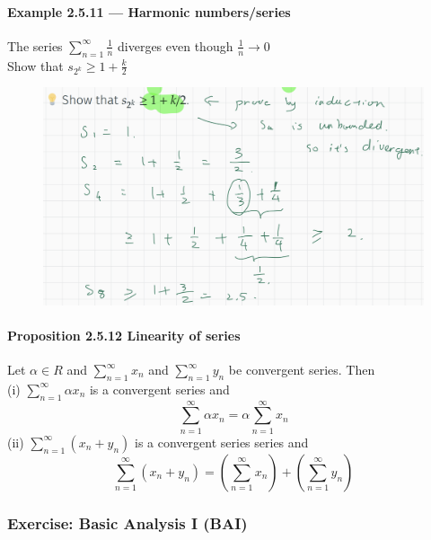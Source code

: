 \documentclass{article}
\begin{document}
\paragraph{Example 2.5.11 — Harmonic numbers/series}
The series $\sum_{n=1}^{\infty}\frac{1}{n}$ diverges even though $\frac{1}{n}\to 0$\\
Show that $s_{2^k}\ge 1+\frac{k}{2}$
\begin{figure}[H]
    \centering
    \includegraphics{0142}
\end{figure}
\paragraph{Proposition 2.5.12 Linearity of series}
Let $\alpha \in R$ and $\sum_{n=1}^{\infty}x_n$ and $\sum_{n=1}^{\infty}y_n$ be convergent series. Then\\
(i) $\sum_{n=1}^{\infty}\alpha x_n$ is a convergent series and $$\sum_{n=1}^{\infty}\alpha x_n=\alpha \sum_{n=1}^{\infty}x_n$$
(ii) $\sum_{n=1}^{\infty}(x_n+y_n)$ is a convergent series series and $$\sum_{n=1}^{\infty}(x_n+y_n)=(\sum_{n=1}^{\infty}x_n)+(\sum_{n=1}^{\infty}y_n)$$
\subsubsection{Exercise: Basic Analysis I (BAI)}
\end{document}
